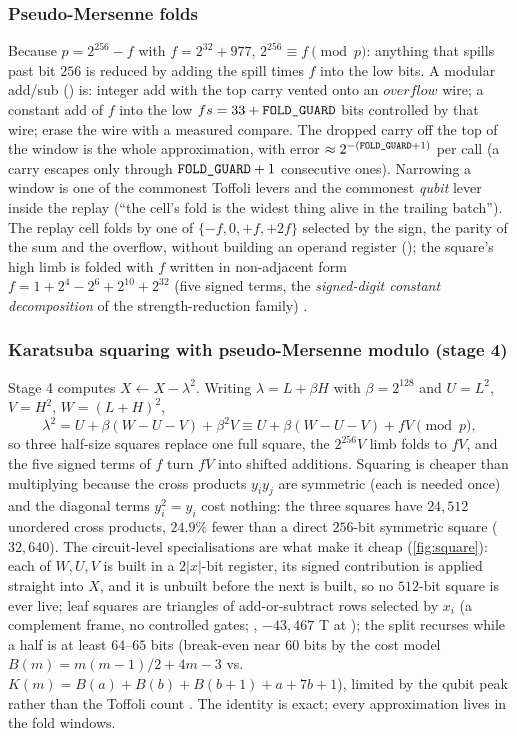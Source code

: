 \subsubsection{Pseudo-Mersenne folds}\label{sec:fold}

Because $p=2^{256}-f$ with $f=2^{32}+977$, $2^{256}\equiv f\pmod p$: anything that spills past bit $256$ is reduced by adding the spill times $f$ into the low bits. A modular add/sub () is: integer add with the top carry vented onto an $\mathit{overflow}$ wire; a constant add of $f$ into the low $fs=33+\texttt{FOLD\_GUARD}$ bits controlled by that wire; erase the wire with a measured compare. The dropped carry off the top of the window is the whole approximation, with error $\approx2^{-(\texttt{FOLD\_GUARD}+1)}$ per call (a carry escapes only through $\texttt{FOLD\_GUARD}+1$ consecutive ones). Narrowing a window is one of the commonest Toffoli levers and the commonest \emph{qubit} lever inside the replay (``the cell's fold is the widest thing alive in the trailing batch''). The replay cell folds by one of $\{-f,0,+f,+2f\}$ selected by the sign, the parity of the sum and the overflow, without building an operand register (); the square's high limb is folded with $f$ written in non-adjacent form $f=1+2^4-2^6+2^{10}+2^{32}$ (five signed terms, the \emph{signed-digit constant decomposition} of the strength-reduction family) \cite{ecdsafail26,ecdsafail-wiki}.

\subsubsection{Karatsuba squaring with pseudo-Mersenne modulo (stage 4)}\label{sec:square}

Stage 4 computes $X\gets X-\lambda^2$. Writing $\lambda=L+\beta H$ with $\beta=2^{128}$ and $U=L^2$, $V=H^2$, $W=(L+H)^2$,
\begin{equation}\label{eq:karatsuba}
\lambda^2=U+\beta(W-U-V)+\beta^2V\equiv U+\beta(W-U-V)+fV\pmod p ,
\end{equation}
so three half-size squares replace one full square, the $2^{256}V$ limb folds to $fV$, and the five signed terms of $f$ turn $fV$ into shifted additions. Squaring is cheaper than multiplying because the cross products $y_iy_j$ are symmetric (each is needed once) and the diagonal terms $y_i^2=y_i$ cost nothing: the three squares have $24{,}512$ unordered cross products, $24.9\%$ fewer than a direct $256$-bit symmetric square ($32{,}640$). The circuit-level specialisations are what make it cheap (\cref{fig:square}): each of $W,U,V$ is built in a $2|x|$-bit register, its signed contribution is applied straight into $X$, and it is unbuilt before the next is built, so no $512$-bit square is ever live; leaf squares are triangles of add-or-subtract rows selected by $x_i$ (a complement frame, no controlled gates; , $-43{,}467$ T at ); the split recurses while a half is at least $64$--$65$ bits (break-even near $60$ bits by the cost model $B(m)=m(m-1)/2+4m-3$ vs.\ $K(m)=B(a)+B(b)+B(b+1)+a+7b+1$), limited by the qubit peak rather than the Toffoli count \cite{ecdsafail26,ecdsafail-wiki}. The identity is exact; every approximation lives in the fold windows.

